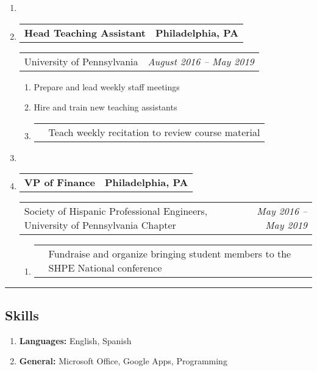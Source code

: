 \documentclass[letterpaper]{article}
\makeatletter
\newcommand*{\tabulardef}[3]{\begin{tabular}[t]{@{}lp{\dimexpr\linewidth-#1}@{}}
    #2&#3
\end{tabular}}
\newcommand{\headerrow}[2]
{\begin{tabular*}{\linewidth}{l@{\extracolsep{\fill}}r}
	#1 &
	#2 \\
\end{tabular*}}
\makeatother
\begin{document}
\begin{enumerate}[label=]
    \item

	\item
		\headerrow
			{\textbf{Head Teaching Assistant}}
            {\textbf{Philadelphia, PA}}
	\headerrow
        {University of Pennsylvania}
		{\emph{August 2016 -- May 2019}}
	\begin{enumerate}[label= *]
		\parskip=-0.1em
        \item Prepare and lead weekly staff meetings
        \item Hire and train new teaching assistants
        \item\tabulardef{5cm}{}{Teach weekly recitation to review course material}
	\end{enumerate}

    \item

       \item
               \headerrow
                       {\textbf{VP of Finance}}
                       {\textbf{Philadelphia, PA}}
       \headerrow
               {Society of Hispanic Professional Engineers, University of Pennsylvania Chapter}
               {\emph{May 2016 -- May 2019}}
       \begin{enumerate}[label= *]
       \parskip=-0.1em
               \item\tabulardef{5cm}{}{Fundraise and organize bringing student members to the SHPE National conference}
       \end{enumerate}
\end{enumerate}

\hrule
\vspace{-0.6em}
\subsection*{Skills}
\begin{enumerate}[label=]
	\parskip=-0.25em

	\item
	\textbf{Languages: } English, Spanish

	\item
	\textbf{General: } Microsoft Office, Google Apps, Programming

\end{enumerate}
\end{document}
